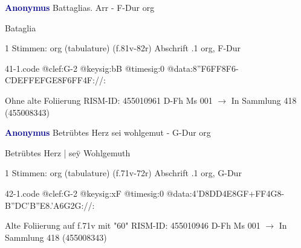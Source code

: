 \documentclass[twocolumn]{book}
\begin{document}
\newline \par \vspace{7pt} \textcolor{darkblue}{\textbf{Anonymus  }}
\newline Battaglias. Arr - F-Dur
\newline org
\newline \begin{itshape}[f.81v, at left:] Bataglia\end{itshape} 
\newline \textcolor{darkblue}{}  1 Stimmen: org (tabulature)  (f.81v-82r)
\newline Abschrift
.1  org, F-Dur  
\begin{filecontents*}{41-1.code}
@clef:G-2
@keysig:bB
@timesig:0
@data:{8''F6FF}8F6-C{DEFF}{EFGE}{8F6FF}4F://:
\end{filecontents*}
\newline
%
\newline Ohne alte Foliierung
\newline RISM-ID: 455010961
\newline D-Fh  Ms 001
\newline $\rightarrow$ In Sammlung 418 (455008343)
      
\newline \par \vspace{7pt} \textcolor{darkblue}{\textbf{Anonymus  }}
\newline Betrübtes Herz sei wohlgemut - G-Dur
\newline org
\newline \begin{itshape}[f.71v, at left:] Betrübtes Herz | seÿ Wohlgemuth\end{itshape} 
\newline \textcolor{darkblue}{}  1 Stimmen: org (tabulature)  (f.71v-72r)
\newline Abschrift
.1  org, G-Dur  
\begin{filecontents*}{42-1.code}
@clef:G-2
@keysig:xF
@timesig:0
@data:4'D{8DD}4E{8GF+}{FF}4G8-{B''DC}{'B''E8.'A6G}2G://:
\end{filecontents*}
\newline
%
\newline Alte Foliierung auf f.71v mit "60"
\newline RISM-ID: 455010946
\newline D-Fh  Ms 001
\newline $\rightarrow$ In Sammlung 418 (455008343)
      
\end{document}
